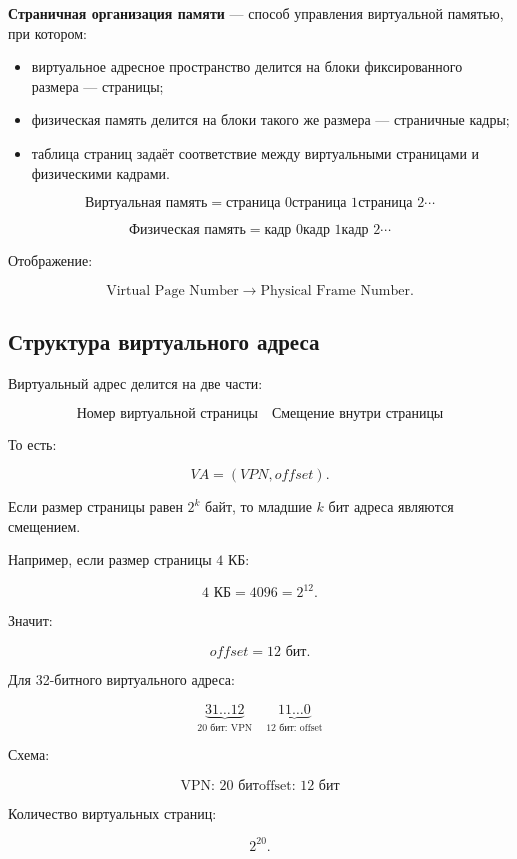 \documentclass[12pt,a4paper]{article}
\theoremstyle{remark}
\begin{document}
\textbf{Страничная организация памяти} --- способ управления виртуальной памятью, при котором:
\begin{itemize}
    \item виртуальное адресное пространство делится на блоки фиксированного размера --- страницы;
    \item физическая память делится на блоки такого же размера --- страничные кадры;
    \item таблица страниц задаёт соответствие между виртуальными страницами и физическими кадрами.
\end{itemize}

\[
\boxed{\text{Виртуальная память}}
=
\boxed{\text{страница 0}}
\boxed{\text{страница 1}}
\boxed{\text{страница 2}}
\cdots
\]

\[
\boxed{\text{Физическая память}}
=
\boxed{\text{кадр 0}}
\boxed{\text{кадр 1}}
\boxed{\text{кадр 2}}
\cdots
\]

Отображение:

\[
\text{Virtual Page Number} \longrightarrow \text{Physical Frame Number}.
\]

\subsection{Структура виртуального адреса}

Виртуальный адрес делится на две части:

\[
\boxed{\text{Номер виртуальной страницы}}
\quad
\boxed{\text{Смещение внутри страницы}}
\]

То есть:

\[
VA = (VPN, offset).
\]

Если размер страницы равен $2^k$ байт, то младшие $k$ бит адреса являются смещением.

Например, если размер страницы $4$ КБ:

\[
4 \text{ КБ} = 4096 = 2^{12}.
\]

Значит:

\[
offset = 12 \text{ бит}.
\]

Для 32-битного виртуального адреса:

\[
\underbrace{31 \ldots 12}_{20 \text{ бит: VPN}}
\quad
\underbrace{11 \ldots 0}_{12 \text{ бит: offset}}
\]

Схема:

\[
\boxed{\text{VPN: 20 бит}}
\boxed{\text{offset: 12 бит}}
\]

Количество виртуальных страниц:

\[
2^{20}.
\]
\end{document}
